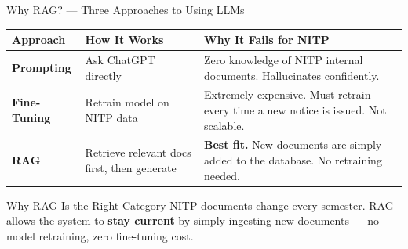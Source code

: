\documentclass[11pt]{beamer}
\begin{document}
\begin{frame}{Why RAG? --- Three Approaches to Using LLMs}
    \begin{table}[h]
    \centering
    \small
    \begin{tabular}{@{}p{2.2cm}p{3.2cm}p{4.2cm}@{}}
        \toprule
        \textbf{Approach} & \textbf{How It Works} & \textbf{Why It Fails for NITP}\\
        \midrule
        \textbf{Prompting} & Ask ChatGPT directly & Zero knowledge of NITP internal documents. Hallucinates confidently.\\[6pt]
        \textbf{Fine-Tuning} & Retrain model on NITP data & Extremely expensive. Must retrain every time a new notice is issued. Not scalable.\\[6pt]
        \textbf{RAG} & Retrieve relevant docs first, then generate & \textcolor{implgreen}{\textbf{Best fit.}} New documents are simply added to the database. No retraining needed.\\
        \bottomrule
    \end{tabular}
    \end{table}
    \begin{block}{Why RAG Is the Right Category}
        NITP documents change every semester. RAG allows the system to \textbf{stay current} by simply ingesting new documents --- no model retraining, zero fine-tuning cost.
    \end{block}
\end{frame}

\end{document}
